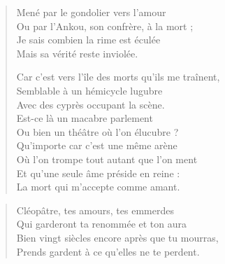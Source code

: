 \begin{verse}
Mené par le gondolier vers l’amour\\
Ou par l’Ankou, son confrère, à la mort ;\\
Je sais combien la rime est éculée\\
Mais sa vérité reste inviolée.

Car c’est vers l’île des morts qu’ils me traînent,\\
Semblable à un hémicycle lugubre\\
Avec des cyprès occupant la scène.\\
Est-ce là un macabre parlement\\
Ou bien un théâtre où l’on élucubre ?\\
Qu’importe car c’est une même arène\\
Où l’on trompe tout autant que l’on ment\\
Et qu’une seule âme préside en reine :\\
La mort qui m’accepte comme amant.
\end{verse}

\begin{verse}
Cléopâtre, tes amours, tes emmerdes\\
Qui garderont ta renommée et ton aura\\
Bien vingt siècles encore après que tu mourras,\\
Prends gardent à ce qu’elles ne te perdent.
\end{verse}


